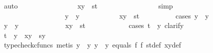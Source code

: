 \begin{isabellebody}
\ auto\isanewline
\ \ \ \ \ \ \ \ \ \ \ \ \ \isamarkupfalse%
\ \isamarkupfalse%
\ {\isachardoublequoteopen}{\isasymlangle}x{\isacharcomma}{\kern0pt}y{\isasymrangle}\ {\isacharequal}{\kern0pt}\ {\isasymlangle}s{\isacharcomma}{\kern0pt}t{\isasymrangle}{\isachardoublequoteclose}\isanewline
\ \ \ \ \ \ \ \ \ \ \ \ \ \ \ \isamarkupfalse%
\ simp\isanewline
\ \ \ \ \ \ \ \ \ \ \ \isamarkupfalse%
\isanewline
\ \ \ \ \ \ \ \ \ \isamarkupfalse%
\isanewline
\ \ \ \ \ \ \ \isamarkupfalse%
\isanewline
\ \ \ \ \ \ \ \ \ \isamarkupfalse%
\ {\isachardoublequoteopen}y\ {\isasymnoteq}\ y{}{\isachardoublequoteclose}\isanewline
\ \ \ \ \ \ \ \ \ \isamarkupfalse%
\ {\isachardoublequoteopen}{\isasymlangle}x{\isacharcomma}{\kern0pt}y{\isasymrangle}\ {\isacharequal}{\kern0pt}\ {\isasymlangle}s{\isacharcomma}{\kern0pt}t{\isasymrangle}{\isachardoublequoteclose}\isanewline
\ \ \ \ \ \ \ \ \ \isamarkupfalse%
{\isacharparenleft}{\kern0pt}cases\ {\isachardoublequoteopen}y\ {\isacharequal}{\kern0pt}\ y{}{\isachardoublequoteclose}{\isacharparenright}{\kern0pt}\isanewline
\ \ \ \ \ \ \ \ \ \ \ \isamarkupfalse%
\ {\isachardoublequoteopen}y\ {\isacharequal}{\kern0pt}\ y{}{\isachardoublequoteclose}\isanewline
\ \ \ \ \ \ \ \ \ \ \ \isamarkupfalse%
\ {\isachardoublequoteopen}{\isasymlangle}x{\isacharcomma}{\kern0pt}y{\isasymrangle}\ {\isacharequal}{\kern0pt}\ {\isasymlangle}s{\isacharcomma}{\kern0pt}t{\isasymrangle}{\isachardoublequoteclose}\isanewline
\ \ \ \ \ \ \ \ \ \ \ \isamarkupfalse%
{\isacharparenleft}{\kern0pt}cases\ {\isachardoublequoteopen}t\ {\isacharequal}{\kern0pt}\ y{}{\isachardoublequoteclose}{\isacharcomma}{\kern0pt}\ clarify{\isacharparenright}{\kern0pt}\isanewline
\ \ \ \ \ \ \ \ \ \ \ \ \ \isamarkupfalse%
\ {\isachardoublequoteopen}t\ {\isacharequal}{\kern0pt}\ y{}\ {\isasymLongrightarrow}\ {\isasymlangle}x{\isacharcomma}{\kern0pt}y{\isasymrangle}\ {\isacharequal}{\kern0pt}\ {\isasymlangle}s{\isacharcomma}{\kern0pt}y{}{\isasymrangle}{\isachardoublequoteclose}\isanewline
\ \ \ \ \ \ \ \ \ \ \ \ \ \ \ \isamarkupfalse%
\ {\isacharparenleft}{\kern0pt}typecheck{\isacharunderscore}{\kern0pt}cfuncs{\isacharcomma}{\kern0pt}\ metis\ {\isacartoucheopen}y\ {\isacharequal}{\kern0pt}\ y{}{\isacartoucheclose}\ {\isacartoucheopen}y\ {\isasymnoteq}\ y{}{\isacartoucheclose}\ equals\ f{}\ f{}\ st{\isacharunderscore}{\kern0pt}def\ xy{\isacharunderscore}{\kern0pt}def{\isacharparenright}{\kern0pt}\isanewline

\end{isabellebody}
